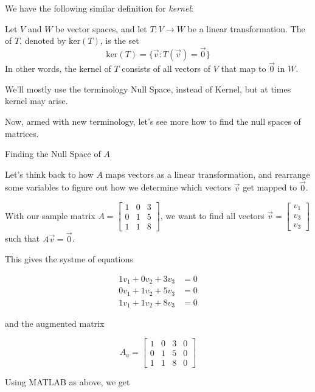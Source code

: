 \documentclass{ximera}
\begin{document}
We have the following similar definition for \emph{kernel}:

\begin{definition}
    Let $V$ and $W$ be vector spaces, and let $T:V\rightarrow W$ be a linear transformation.  The  of $T$, denoted by $\mbox{ker}(T)$, is the set
    $$\mbox{ker}(T)=\{\vec{v}:T(\vec{v})=\vec{0}\}$$
    In other words, the kernel of $T$ consists of all vectors of $V$ that map to $\vec{0}$ in $W$.
\end{definition}

We'll mostly use the terminology Null Space, instead of Kernel, but at times kernel may arise. 

Now, armed with new terminology, let's see more how to find the null spaces of matrices. 

\begin{exploration}{Finding the Null Space of $A$}

Let's think back to how $A$ maps vectors as a linear transformation, and rearrange some variables to figure out how we determine which vectors $\vec{v}$ get mapped to $\vec{0}$. 

With our sample matrix $A=\begin{bmatrix} 1 & 0 & 3 \\ 0 & 1 & 5 \\ 1 & 1 & 8 \end{bmatrix}$, we want to find all vectors $\vec{v} = \begin{bmatrix} v_1 \\ v_3 \\ v_3 \end{bmatrix}$ such that $A\vec{v} = \vec{0}$.

This gives the systme of equations

\[
\begin{aligned}
    1v_1 + 0v_2 + 3v_3 &= 0 \\
    0v_1 + 1v_2 + 5v_3 &= 0 \\
    1v_1 + 1v_2 + 8v_3 &= 0
\end{aligned}
\]

and the augmented matrix

\[A_a=\left[\begin{array}{ccc|c}1&0&3&0\\
    0&1&5&0\\
    1&1&8&0
\end{array}\right]\]

Using MATLAB as above, we get


\end{exploration}
\end{document}
